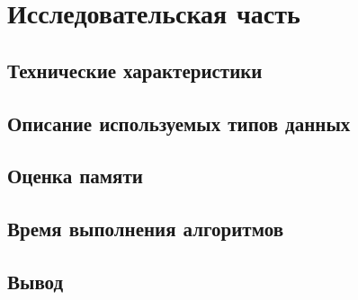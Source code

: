\chapter{Исследовательская часть}

\section{Технические характеристики}

\section{Описание используемых типов данных}

\section{Оценка памяти}

\section{Время выполнения алгоритмов}

\section{Вывод}
